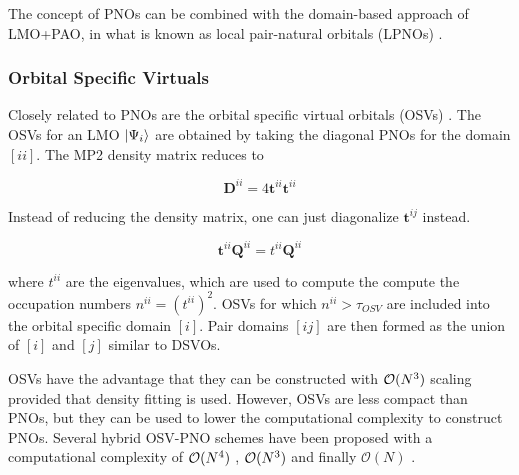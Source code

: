 The concept of PNOs can be combined with the domain-based approach of LMO+PAO, in what is known as local pair-natural orbitals (LPNOs) \cite{Rip2013}. 



\subsubsection*{Orbital Specific Virtuals}

Closely related to PNOs are the orbital specific virtual orbitals (OSVs) \cite{Yan2011}. The OSVs for an LMO $\ket{\Psi_i}$ are obtained by taking the diagonal PNOs for the domain $[ii]$. The MP2 density matrix reduces to

\begin{equation}
\mathbf{D}^{ii} = 4 \mathbf{t}^{ii} \mathbf{t}^{ii}
\end{equation}

\noindent Instead of reducing the density matrix, one can just diagonalize $\mathbf{t}^{ij}$ instead. 

\begin{equation}
\mathbf{t}^{ii} \mathbf{Q}^{ii} = t^{ii} \mathbf{Q}^{ii}
\end{equation}

\noindent where $t^{ii}$ are the eigenvalues, which are used to compute the compute the occupation numbers $n^{ii} = \left( t^{ii} \right)^2$. OSVs for which $n^{ii} > \tau_{OSV}$ are included into the orbital specific domain $[i]$. Pair domains $[ij]$ are then formed as the union of $[i]$ and $[j]$ similar to DSVOs. 

OSVs have the advantage that they can be constructed with $\mathcal{O}(N^{3})$ scaling provided that density fitting is used. However, OSVs are less compact than PNOs, but they can be used to lower the computational complexity to construct PNOs. Several hybrid OSV-PNO schemes have been proposed with a computational complexity of $\mathcal{O}(N^{4})$ \cite{Kra2012}, $\mathcal{O}(N^{3})$ \cite{Sch2013} and finally $\mathcal{O}(N)$ \cite{Rip2013}.




